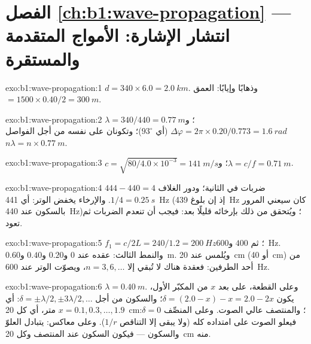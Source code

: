 \section*{الفصل \ref{ch:b1:wave-propagation} --- انتشار الإشارة: الأمواج المتقدمة والمستقرة}

\begin{solution}{exo:b1:wave-propagation:1}
$d = 340 \times 6.0 = \qty{2.0}{km}$. وذهابًا وإيابًا: العمق $= 1500 \times
0.40/2 = \qty{300}{m}$.
\end{solution}

\begin{solution}{exo:b1:wave-propagation:2}
$\lambda = 340/440 = \qty{0.77}{m}$؛ و$\Delta\varphi = 2\pi \times
0.20/0.773 = \qty{1.6}{rad}$ (أي $93^\circ$)؛ وتكونان على  نفسه من أجل الفواصل
$n\lambda = n \times \qty{0.77}{m}$.
\end{solution}

\begin{solution}{exo:b1:wave-propagation:3}
$c = \sqrt{80/4.0\times10^{-3}} = \qty{141}{m/s}$؛ و$\lambda = c/f =
\qty{0.71}{m}$.
\end{solution}

\begin{solution}{exo:b1:wave-propagation:4}
$444 - 440 = 4$ ضربات في الثانية؛ ودور الغلاف $1/4 = \qty{0.25}{s}$.
والإرخاء يخفض الوتر: أي \qty{441}{Hz} (إذ إن بلوغ \qty{439}{Hz} كان
سيعني المرور بالسكون عند \qty{440}{Hz})؛ ويُتحقق من ذلك بإرخائه
قليلًا بعد: فيجب أن تنعدم الضربات ثم تعود.
\end{solution}

\begin{solution}{exo:b1:wave-propagation:5}
$f_1 = c/2L = 240/1.2 = \qty{200}{Hz}$؛ ثم $400$ و\qty{600}{Hz}. والنمط الثالث:
عقده عند $0$ و$0.20$ و$0.40$ و\qty{0.60}{m}. ويُلمس عند \qty{20}{cm} (أو
\qty{40}{cm}) من أحد الطرفين: فعقدة هناك لا تُبقي إلا $n = 3, 6, \dots$، ويصوّت
الوتر عند \qty{600}{Hz}.
\end{solution}

\begin{solution}{exo:b1:wave-propagation:6}
$\lambda = \qty{0.40}{m}$. وعلى القطعة، على بعد $x$ من المكبّر
الأول، يكون $\delta = (2.0 - x) - x = 2.0 - 2x$؛ والسكون من أجل $\delta = \pm\lambda/2,
\pm 3\lambda/2, \dots$: أي $x = 0.1, 0.3, \dots, 1.9$ متر، أي كل \qty{20}{cm}؛
والمنتصف عالي الصوت. وعلى المنصِّف $\delta = 0$: فيعلو الصوت على امتداده كله (ولا يبقى
إلا التناقص $1/r$). وعلى  معاكس: يتبادل العلوّ والسكون --- فيكون السكون عند
المنتصف وكل \qty{20}{cm} منه.
\end{solution}

